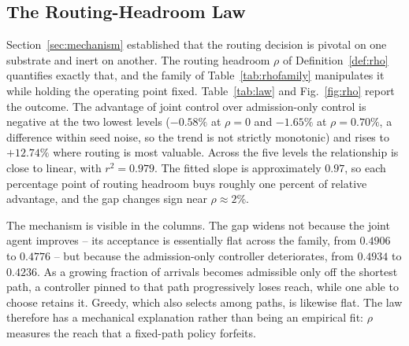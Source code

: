 \documentclass[10pt,journal,comsoc]{IEEEtran}
\begin{document}
\subsection{The Routing-Headroom Law}
\label{sec:law}
Section~\ref{sec:mechanism} established that the routing decision is
pivotal on one substrate and inert on another. The routing headroom $\rho$
of Definition~\ref{def:rho} quantifies exactly that, and the family of
Table~\ref{tab:rhofamily} manipulates it while holding the operating point
fixed. Table~\ref{tab:law} and Fig.~\ref{fig:rho} report the outcome. The
advantage of joint control over admission-only control is negative at the
two lowest levels ($-0.58\%$ at $\rho=0$ and $-1.65\%$ at $\rho=0.70\%$, a
difference within seed noise, so the trend is not strictly monotonic) and
rises to $+12.74\%$ where routing is most valuable. Across the five levels
the relationship is close to linear, with $r^2=0.979$. The fitted slope is
approximately $0.97$, so each percentage point of routing headroom buys
roughly one percent of relative advantage, and the gap changes sign near
$\rho \approx 2\%$.

The mechanism is visible in the columns. The gap widens not because the
joint agent improves -- its acceptance is essentially flat across the
family, from $0.4906$ to $0.4776$ -- but because the admission-only
controller deteriorates, from $0.4934$ to $0.4236$. As a growing fraction
of arrivals becomes admissible only off the shortest path, a controller
pinned to that path progressively loses reach, while one able to choose
retains it. Greedy, which also selects among paths, is likewise flat. The
law therefore has a mechanical explanation rather than being an empirical
fit: $\rho$ measures the reach that a fixed-path policy forfeits.
\end{document}
